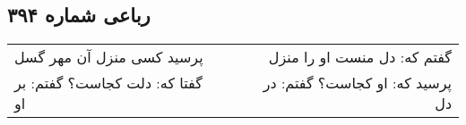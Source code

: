 \begin{center}
\section*{رباعی شماره ۳۹۴}
\label{sec:sh394}
\begin{longtable}{l p{0.5cm} r}
پرسید کسی منزل آن مهر گسل
&&
گفتم که: دل منست او را منزل
\\
گفتا که: دلت کجاست؟ گفتم: بر او
&&
پرسید که: او کجاست؟ گفتم: در دل
\\
\end{longtable}
\end{center}
